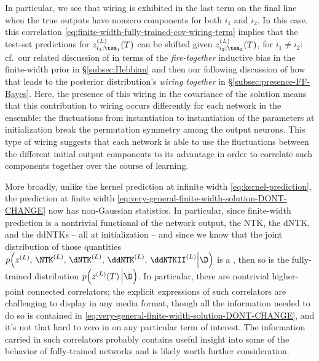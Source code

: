 In particular, we see that wiring is exhibited in the last term on the final line when the true outputs have nonzero components for both $i_1$ and $i_2$.
In this case, this correlation \eqref{eq:finite-width-fully-trained-cov-wiring-term} implies that the test-set predictions for $z_{i_1;\tea_1}^{(L)}(T)$ can be shifted given $z_{i_2;\tea_2}^{(L)}(T)$, for $i_1 \neq i_2$: cf.~our related discussion of  in terms of the \emph{fire-together} inductive bias in the finite-width prior in \S\ref{subsec:Hebbian} and then our following discussion of how that leads to the posterior distribution's \emph{wiring together} in \S\ref{subsec:presence-FF-Bayes}. Here, the presence of this wiring in the covariance of the solution means that this contribution to wiring occurs differently for  each network in the ensemble: the fluctuations from instantiation to instantiation of the  parameters at initialization break the permutation symmetry among the output neurons. This type of wiring suggests that each network is able to use the fluctuations between the different initial output components to its advantage in order to correlate such components together over the course of learning.





More broadly, unlike the kernel prediction at infinite width \eqref{eq:kernel-prediction}, the prediction at finite width \eqref{eq:very-general-finite-width-solution-DONT-CHANGE} now has non-Gaussian statistics. In particular, since finite-width prediction 
is a nontrivial functional of the network output, the NTK, the dNTK, and the ddNTKs -- all at initialization --  
and since we know that the joint distribution of those quantities $p\Big(z^{(L)}, \, \NTK^{(L)},\, \dNTK^{(L)}, \, \ddNTK^{(L)},\, \ddNTKII^{(L)}\Big\vert \D\Big)$ 
is a , then so is the fully-trained distribution $p\Big(z^{(L)}(T) \, \Big\vert \D\Big)$. In particular, there are nontrivial higher-point connected correlators; the explicit expressions of such correlators are challenging to display in any media format, though all the information needed to do so is contained in \eqref{eq:very-general-finite-width-solution-DONT-CHANGE}, and it's not that hard to zero in on any particular term of interest. The information carried in such correlators probably contains useful insight into some of the behavior of fully-trained networks and is likely worth further consideration.





